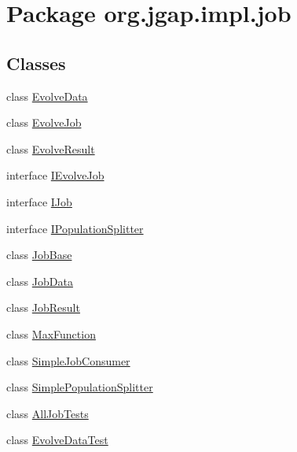 \hypertarget{namespaceorg_1_1jgap_1_1impl_1_1job}{\section{Package org.\-jgap.\-impl.\-job}
\label{namespaceorg_1_1jgap_1_1impl_1_1job}
}
\subsection*{Classes}
\begin{DoxyCompactItemize}
\item 
class \hyperlink{classorg_1_1jgap_1_1impl_1_1job_1_1_evolve_data}{Evolve\-Data}
\item 
class \hyperlink{classorg_1_1jgap_1_1impl_1_1job_1_1_evolve_job}{Evolve\-Job}
\item 
class \hyperlink{classorg_1_1jgap_1_1impl_1_1job_1_1_evolve_result}{Evolve\-Result}
\item 
interface \hyperlink{interfaceorg_1_1jgap_1_1impl_1_1job_1_1_i_evolve_job}{I\-Evolve\-Job}
\item 
interface \hyperlink{interfaceorg_1_1jgap_1_1impl_1_1job_1_1_i_job}{I\-Job}
\item 
interface \hyperlink{interfaceorg_1_1jgap_1_1impl_1_1job_1_1_i_population_splitter}{I\-Population\-Splitter}
\item 
class \hyperlink{classorg_1_1jgap_1_1impl_1_1job_1_1_job_base}{Job\-Base}
\item 
class \hyperlink{classorg_1_1jgap_1_1impl_1_1job_1_1_job_data}{Job\-Data}
\item 
class \hyperlink{classorg_1_1jgap_1_1impl_1_1job_1_1_job_result}{Job\-Result}
\item 
class \hyperlink{classorg_1_1jgap_1_1impl_1_1job_1_1_max_function}{Max\-Function}
\item 
class \hyperlink{classorg_1_1jgap_1_1impl_1_1job_1_1_simple_job_consumer}{Simple\-Job\-Consumer}
\item 
class \hyperlink{classorg_1_1jgap_1_1impl_1_1job_1_1_simple_population_splitter}{Simple\-Population\-Splitter}
\item 
class \hyperlink{classorg_1_1jgap_1_1impl_1_1job_1_1_all_job_tests}{All\-Job\-Tests}
\item 
class \hyperlink{classorg_1_1jgap_1_1impl_1_1job_1_1_evolve_data_test}{Evolve\-Data\-Test}
\end{DoxyCompactItemize}
